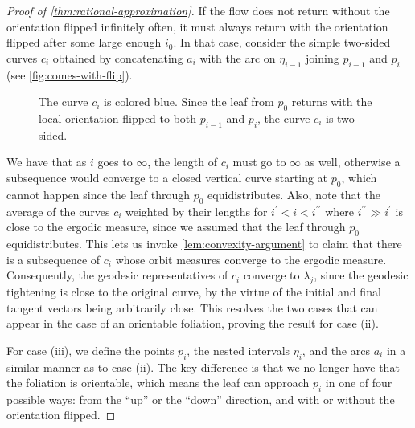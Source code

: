 \begin{proof}[Proof of \autoref{thm:rational-approximation}]
  If the flow does not return without the orientation flipped infinitely often, it must always return with the orientation flipped after some large enough $i_0$.
  In that case, consider the simple two-sided curves $c_i$ obtained by concatenating $a_i$ with the arc on $\eta_{i-1}$ joining $p_{i-1}$ and $p_i$ (see \autoref{fig:comes-with-flip}).
  \begin{figure}[h]
    \centering
    \caption{The curve $c_i$ is colored blue. Since the leaf from $p_0$ returns with the local orientation flipped to both $p_{i-1}$ and $p_{i}$, the curve $c_i$ is two-sided.}
    \label{fig:comes-with-flip}
  \end{figure}
  We have that as $i$ goes to $\infty$, the length of $c_i$ must go to $\infty$ as well, otherwise a subsequence would converge to a closed vertical curve starting at $p_0$, which cannot happen since the leaf through $p_0$ equidistributes.
  Also, note that the average of the curves $c_i$ weighted by their lengths for $i^{\prime} < i < i^{\prime \prime}$ where $i^{\prime \prime} \gg i^{\prime}$ is close to the ergodic measure, since we assumed that the leaf through $p_0$ equidistributes.
  This lets us invoke \autoref{lem:convexity-argument} to claim that there is a subsequence of $c_i$ whose orbit measures converge to the ergodic measure.
  Consequently, the geodesic representatives of $c_i$ converge to $\lambda_j$, since the geodesic tightening is close to the original curve, by the virtue of the initial and final tangent vectors being arbitrarily close.
  This resolves the two cases that can appear in the case of an orientable foliation, proving the result for case (ii).

  For case (iii), we define the points $p_i$, the nested intervals $\eta_i$, and the arcs $a_i$ in a similar manner as to case (ii).
  The key difference is that we no longer have that the foliation is orientable, which means the leaf can approach $p_i$ in one of four possible ways: from the ``up'' or the ``down'' direction, and with or without the orientation flipped.


\end{proof}
